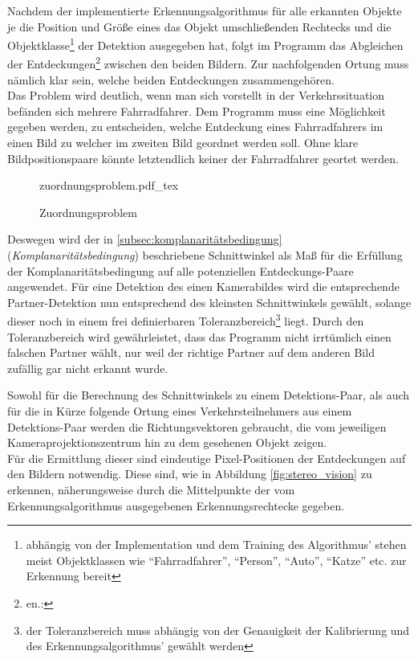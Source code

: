 \noindent Nachdem der implementierte Erkennungsalgorithmus für alle erkannten Objekte je die Position und Größe eines das Objekt umschließenden Rechtecks und die Objektklasse\footnote{abhängig von der Implementation und dem Training des Algorithmus' stehen meist Objektklassen wie ``Fahrradfahrer'', ``Person'', ``Auto'', ``Katze'' etc. zur Erkennung bereit} der Detektion ausgegeben hat, folgt im Programm das Abgleichen der Entdeckungen\footnote{en.: } zwischen den beiden Bildern. Zur nachfolgenden Ortung muss nämlich klar sein, welche beiden Entdeckungen zusammengehören.\\
Das Problem wird deutlich, wenn man sich vorstellt in der Verkehrssituation befänden sich mehrere Fahrradfahrer. Dem Programm muss eine Möglichkeit gegeben werden, zu entscheiden, welche Entdeckung eines Fahrradfahrers im einen Bild zu welcher im zweiten Bild geordnet werden soll. Ohne klare Bildpositionspaare könnte letztendlich keiner der Fahrradfahrer geortet werden.

\begin{figure}[H]
	\centering
	\def\svgwidth{12cm}
	{zuordnungsproblem.pdf_tex}
	\caption{Zuordnungsproblem}
	\label{fig:zuordnungsproblem}
\end{figure}

Deswegen wird der in \ref{subsec:komplanaritätsbedingung} (\emph{Komplanaritätsbedingung}) beschriebene Schnittwinkel als Maß für die Erfüllung der Komplanaritätsbedingung auf alle potenziellen Entdeckungs-Paare angewendet. Für eine Detektion des einen Kamerabildes wird die entsprechende Partner-Detektion nun entsprechend des kleinsten Schnittwinkels gewählt, solange dieser noch in einem frei definierbaren Toleranzbereich\footnote{der Toleranzbereich muss abhängig von der Genauigkeit der Kalibrierung und des Erkennungsalgorithmus' gewählt werden} liegt. Durch den Toleranzbereich wird gewährleistet, dass das Programm nicht irrtümlich einen falschen Partner wählt, nur weil der richtige Partner auf dem anderen Bild zufällig gar nicht erkannt wurde.\kleinerabstand

\noindent Sowohl für die Berechnung des Schnittwinkels zu einem Detektions-Paar, als auch für die in Kürze folgende Ortung eines Verkehrsteilnehmers aus einem Detektions-Paar werden die Richtungsvektoren gebraucht, die vom jeweiligen Kameraprojektionszentrum hin zu dem gesehenen Objekt zeigen.\\
Für die Ermittlung dieser sind eindeutige Pixel-Positionen der Entdeckungen auf den Bildern notwendig. Diese sind, wie in Abbildung \ref{fig:stereo_vision} zu erkennen, näherungsweise durch die Mittelpunkte der vom Erkennungsalgorithmus ausgegebenen Erkennungsrechtecke gegeben.\kleinerabstand